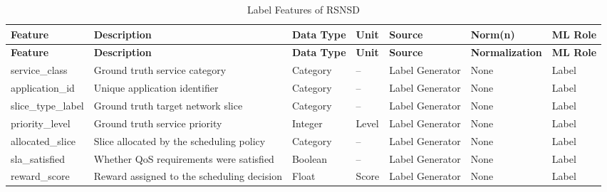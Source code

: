 \documentclass[12pt,a4paper]{article}
\begin{document}
\begin{longtable}{p{3cm}p{4cm}p{2cm}p{1cm}p{2.3cm}p{1.5cm}p{2cm}}
	\caption{Label Features of RSNSD}
	\label{tab:label_features}\\
	
	\toprule
	\textbf{Feature} & \textbf{Description} & \textbf{Data Type} & \textbf{Unit} & \textbf{Source} & \textbf{Norm(n)} & \textbf{ML Role}\\
	\midrule
	\endfirsthead
	
	\toprule
	\textbf{Feature} & \textbf{Description} & \textbf{Data Type} & \textbf{Unit} & \textbf{Source} & \textbf{Normalization} & \textbf{ML Role}\\
	\midrule
	\endhead
	
	service\_class &
	Ground truth service category &
	Category &
	-- &
	Label Generator &
	None &
	Label \\
	
	application\_id &
	Unique application identifier &
	Category &
	-- &
	Label Generator &
	None &
	Label \\
	
	slice\_type\_label &
	Ground truth target network slice &
	Category &
	-- &
	Label Generator &
	None &
	Label \\
	
	priority\_level &
	Ground truth service priority &
	Integer &
	Level &
	Label Generator &
	None &
	Label \\
	
	allocated\_slice &
	Slice allocated by the scheduling policy &
	Category &
	-- &
	Label Generator &
	None &
	Label \\
	
	sla\_satisfied &
	Whether QoS requirements were satisfied &
	Boolean &
	-- &
	Label Generator &
	None &
	Label \\
	
	reward\_score &
	Reward assigned to the scheduling decision &
	Float &
	Score &
	Label Generator &
	None &
	Label \\
	
	\bottomrule
\end{longtable}
\end{document}
